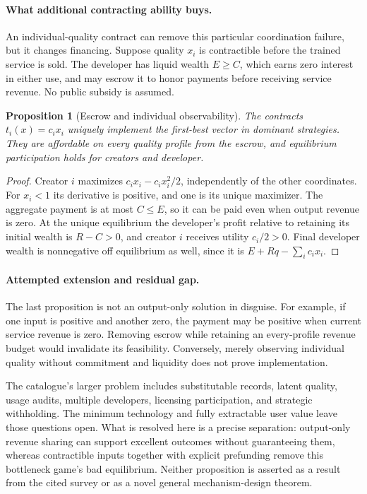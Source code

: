 \documentclass[11pt]{article}
\newtheorem{proposition}[theorem]{Proposition}
\theoremstyle{definition}
\begin{document}
\paragraph{What additional contracting ability buys.}
An individual-quality contract can remove this particular coordination failure, but it changes financing. Suppose quality $x_i$ is contractible before the trained service is sold. The developer has liquid wealth $E\geq C$, which earns zero interest in either use, and may escrow it to honor payments before receiving service revenue. No public subsidy is assumed.

\begin{proposition}[Escrow and individual observability]
The contracts $t_i(x)=c_ix_i$ uniquely implement the first-best vector in dominant strategies. They are affordable on every quality profile from the escrow, and equilibrium participation holds for creators and developer.
\end{proposition}
\begin{proof}
Creator $i$ maximizes $c_ix_i-c_ix_i^2/2$, independently of the other coordinates. For $x_i<1$ its derivative is positive, and one is its unique maximizer. The aggregate payment is at most $C\leq E$, so it can be paid even when output revenue is zero. At the unique equilibrium the developer's profit relative to retaining its initial wealth is $R-C>0$, and creator $i$ receives utility $c_i/2>0$. Final developer wealth is nonnegative off equilibrium as well, since it is $E+Rq-\sum_i c_ix_i$.
\end{proof}

\paragraph{Attempted extension and residual gap.}
The last proposition is not an output-only solution in disguise. For example, if one input is positive and another zero, the payment may be positive when current service revenue is zero. Removing escrow while retaining an every-profile revenue budget would invalidate its feasibility. Conversely, merely observing individual quality without commitment and liquidity does not prove implementation.

The catalogue's larger problem includes substitutable records, latent quality, usage audits, multiple developers, licensing participation, and strategic withholding. The minimum technology and fully extractable user value leave those questions open. What is resolved here is a precise separation: output-only revenue sharing can support excellent outcomes without guaranteeing them, whereas contractible inputs together with explicit prefunding remove this bottleneck game's bad equilibrium. Neither proposition is asserted as a result from the cited survey or as a novel general mechanism-design theorem.
\end{document}
